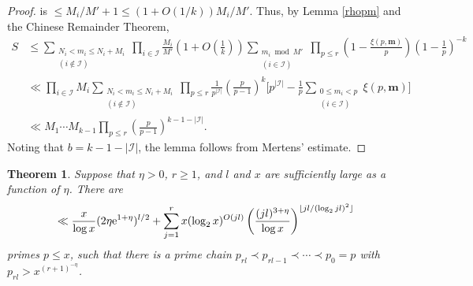\documentclass[12pt]{amsart}
\theoremstyle{remark}
\theoremstyle{plain}
\newtheorem{thm}{Theorem}
\numberwithin{equation}{section}
\renewcommand{\(}{\left(}
\renewcommand{\)}{\right)}
\newcommand{\pfrac}[2]{\left(\frac{#1}{#2}\right)}
\newcommand{\mm}{\ensuremath{\mathbf{m}}}
\newcommand{\er}{{\rm e}}  %
\newcommand{\II}{\mathcal{I}}
\renewcommand{\le}{\leqslant}
\renewcommand{\ge}{\geqslant}
\begin{document}
\begin{proof}
is $\le M_i/M'+1 \le (1+O(1/k))M_i/M'$.
Thus, by Lemma \ref{rhopm} and the Chinese Remainder Theorem,
\begin{align*}
S &\le \sum_{\substack{N_i < m_i \le N_i+M_i \\ (i\not\in \II)}} \prod_{i\in \II}
  \frac{M_i}{M'} \(1+O\pfrac{1}{k} \) \sum_{\substack{m_i\bmod M' \\
      (i\in \II)}}
  \prod_{p\le r} \(1-\frac{\xi(p,\mm)}{p} \) \(1-\frac{1}{p}\)^{-k} \\
&\ll \prod_{i\in \II} M_i \sum_{\substack{N_i < m_i \le N_i+M_i \\
    (i\not\in \II)}}
  \prod_{p\le r} \frac{1}{p^{|\II|}} \pfrac{p}{p-1}^k \biggl[
  p^{|\II|} - \frac{1}{p} \sum_{\substack{0\le m_i<p\\ (i\in \II)}} \xi(p,\mm)
  \biggr] \\
&\ll M_1 \cdots M_{k-1} \prod_{p\le r} \pfrac{p}{p-1}^{k-1-|\II|}.
\end{align*}
Noting that $b=k-1-|\II|$, the lemma follows from Mertens' estimate.
\end{proof}

%
%

\begin{thm}\label{condensed_chain}
Suppose that $\eta>0$, $r\ge 1$, and $l$ and $x$ are
sufficiently large as a function of $\eta$.  There are 
\[
\ll \frac{x}{\log x} (2\eta \er^{1+\eta})^{l/2}+\sum_{j=1}^r x(\log_2 x)^{O(jl)}
\pfrac{(jl)^{3+\eta}}{\log x}^{\lfloor jl/(\log_2 jl)^2 \rfloor}
\]
primes $p\le x$, such that there is a prime chain $p_{rl} \prec p_{rl-1} \prec
\cdots \prec p_0=p$ with $p_{rl}>x^{(r+1)^{-\eta}}$. 
\end{thm}
\end{document}
